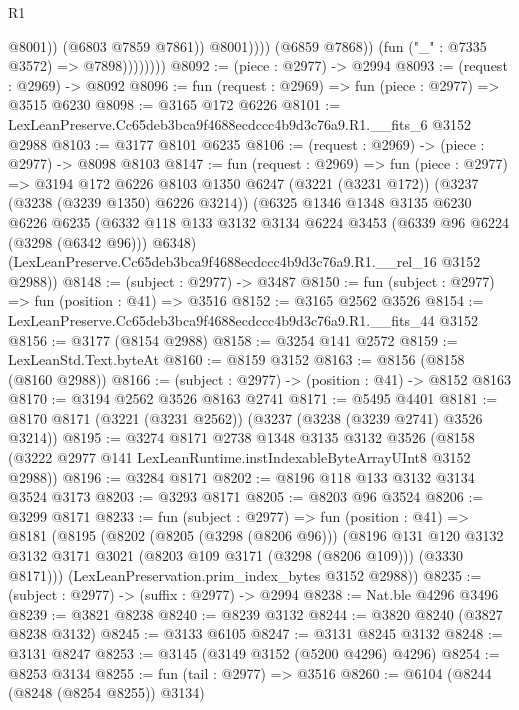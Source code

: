 \begin{lexlean}{R1}
\begin{coremodule}
                                  @8001))
                              (@6803 @7859 @7861))
                            @8001))))
                    (@6859 @7868))
                  (fun ("_" : @7335 @3572) => @7898))))))))
@8092 := (piece : @2977) -> @2994
@8093 := (request : @2969) -> @8092
@8096 := fun (request : @2969) => fun (piece : @2977) => @3515 @6230
@8098 := @3165 @172 @6226
@8101 := LexLeanPreserve.Cc65deb3bca9f4688ecdccc4b9d3c76a9.R1.__fits_6 @3152 @2988
@8103 := @3177 @8101 @6235
@8106 := (request : @2969) -> (piece : @2977) -> @8098 @8103
@8147 := fun (request : @2969) =>
  fun (piece : @2977) =>
  @3194
    @172
    @6226
    @8103
    @1350
    @6247
    (@3221 (@3231 @172))
    (@3237 (@3238 (@3239 @1350) @6226 @3214))
    (@6325
      @1346
      @1348
      @3135
      @6230
      @6226
      @6235
      (@6332 @118 @133 @3132 @3134 @6224 @3453 (@6339 @96 @6224 (@3298 (@6342 @96))) @6348)
      (LexLeanPreserve.Cc65deb3bca9f4688ecdccc4b9d3c76a9.R1.__rel_16 @3152 @2988))
@8148 := (subject : @2977) -> @3487
@8150 := fun (subject : @2977) => fun (position : @41) => @3516
@8152 := @3165 @2562 @3526
@8154 := LexLeanPreserve.Cc65deb3bca9f4688ecdccc4b9d3c76a9.R1.__fits_44 @3152
@8156 := @3177 (@8154 @2988)
@8158 := @3254 @141 @2572
@8159 := LexLeanStd.Text.byteAt
@8160 := @8159 @3152
@8163 := @8156 (@8158 (@8160 @2988))
@8166 := (subject : @2977) -> (position : @41) -> @8152 @8163
@8170 := @3194 @2562 @3526 @8163 @2741
@8171 := @5495 @4401
@8181 := @8170 @8171 (@3221 (@3231 @2562)) (@3237 (@3238 (@3239 @2741) @3526 @3214))
@8195 := @3274
    @8171
    @2738
    @1348
    @3135
    @3132
    @3526
    (@8158 (@3222 @2977 @141 LexLeanRuntime.instIndexableByteArrayUInt8 @3152 @2988))
@8196 := @3284 @8171
@8202 := @8196 @118 @133 @3132 @3134 @3524 @3173
@8203 := @3293 @8171
@8205 := @8203 @96 @3524
@8206 := @3299 @8171
@8233 := fun (subject : @2977) =>
  fun (position : @41) =>
  @8181
    (@8195
      (@8202
        (@8205 (@3298 (@8206 @96)))
        (@8196
          @131
          @120
          @3132
          @3132
          @3171
          @3021
          (@8203 @109 @3171 (@3298 (@8206 @109)))
          (@3330 @8171)))
      (LexLeanPreservation.prim_index_bytes @3152 @2988))
@8235 := (subject : @2977) -> (suffix : @2977) -> @2994
@8238 := Nat.ble @4296 @3496
@8239 := @3821 @8238
@8240 := @8239 @3132
@8244 := @3820 @8240 (@3827 @8238 @3132)
@8245 := @3133 @6105
@8247 := @3131 @8245 @3132
@8248 := @3131 @8247
@8253 := @3145 (@3149 @3152 (@5200 @4296) @4296)
@8254 := @8253 @3134
@8255 := fun (tail : @2977) => @3516
@8260 := @6104 (@8244 (@8248 (@8254 @8255)) @3134)

\end{coremodule}
\end{lexlean}
